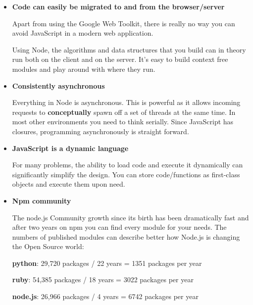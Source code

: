 \documentclass[a4paper,13pt]{report}
\begin{document}
        \begin{itemize}
            \item
            \textbf{Code can easily be migrated to and from the browser/server}\newline
            

            Apart from using the Google Web Toolkit, there is really no way you can avoid JavaScript in a modern web application. \newline

            Using Node, the algorithms and data structures that you build can in theory run both on the client and on the server. It's easy to build context free modules and play around with where they run. 

            \item
            \textbf{Consistently asynchronous}\newline
            

            Everything in Node is asynchronous. This is powerful as it allows incoming requests to \textbf{conceptually} spawn off a set of threads at the same time. In most other environments you need to think serially. Since JavaScript has closures, programming asynchronously is straight forward.

            \item
            \textbf{JavaScript is a dynamic language}\newline
            

            For many problems, the ability to load code and execute it dynamically can significantly simplify the design. You can store code/functions as first-class objects and execute them upon need.

            \item
                \textbf{Npm community}

                The node.js Community growth since its birth has been dramatically fast and after two years on npm you can find every module for your needs.
                The numbers of published modules can describe better how Node.js is changing the Open Source world:

                \textbf{python}:  29,720 packages / 22 years = 1351 packages per year\newline

                \textbf{ruby}:      54,385 packages / 18 years =    3022 packages per year\newline

                \textbf{node.js}:  26,966 packages / 4 years =   6742 packages per year \newline


\end{itemize}
\end{document}
